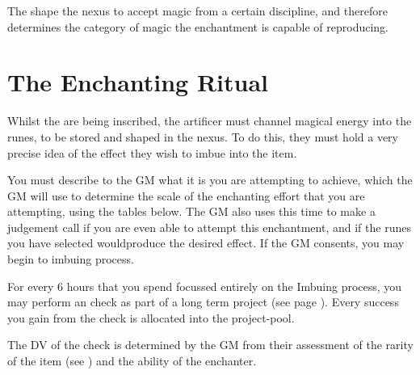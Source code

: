 {
	The  shape the nexus to accept magic from a certain discipline, and therefore determines the category of magic the enchantment is capable of reproducing.
}
{
	
	
	
	
	
	
	
	
	
	
	
	
	
} 



\section{The Enchanting Ritual}

Whilst the  are being inscribed, the artificer must channel magical energy into the runes, to be stored and shaped in the nexus. To do this, they must hold a very precise idea of the effect they wish to imbue into the item. 

You must describe to the GM what it is you are attempting to achieve, which the GM will use to determine the scale of the enchanting effort that you are attempting, using the tables below. The GM also uses this time to make a judgement call if you are even able to attempt this enchantment, and if the runes you have selected wouldproduce the desired effect. If the GM consents, you may begin to imbuing process. 

For every 6 hours that you spend focussed entirely on the Imbuing process, you may perform an  check as part of a long term project (see page \pageref{S:Extended}). Every success you gain from the check is allocated into the project-pool. 

The DV of the check is determined by the GM from their assessment of the rarity of the item (see \pageref{S:ItemRarity}) and the  ability of the enchanter. 

